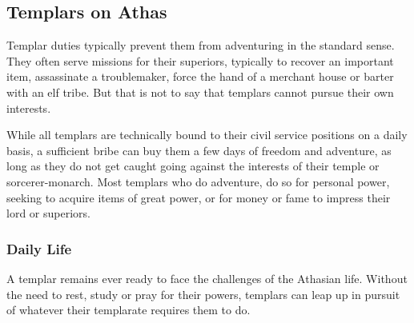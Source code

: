 









\subsection{Templars on Athas}
Templar duties typically prevent them from adventuring in the standard sense. They often serve missions for their superiors, typically to recover an important item, assassinate a troublemaker, force the hand of a merchant house or barter with an elf tribe. But that is not to say that templars cannot pursue their own interests.

While all templars are technically bound to their civil service positions on a daily basis, a sufficient bribe can buy them a few days of freedom and adventure, as long as they do not get caught going against the interests of their temple or sorcerer-monarch. Most templars who do adventure, do so for personal power, seeking to acquire items of great power, or for money or fame to impress their lord or superiors.

\subsubsection{Daily Life}
A templar remains ever ready to face the challenges of the Athasian life. Without the need to rest, study or pray for their powers, templars can leap up in pursuit of whatever their templarate requires them to do.

